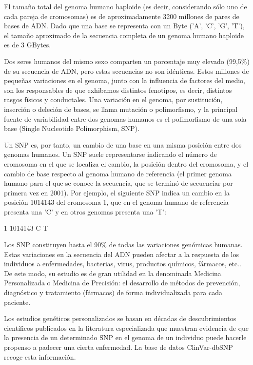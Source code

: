 El tamaño total del genoma humano haploide (es decir, considerando sólo uno de cada pareja de cromosomas) es de aproximadamente 3200 millones de pares de bases de A\-D\-N. Dado que una base se representa con un Byte ('A', 'C', 'G', 'T'), el tamaño aproximado de la secuencia completa de un genoma humano haploide es de 3 G\-Bytes.

Dos seres humanos del mismo sexo comparten un porcentaje muy elevado (99,5\%) de su secuencia de A\-D\-N, pero estas secuencias no son idénticas. Estos millones de pequeñas variaciones en el genoma, junto con la influencia de factores del medio, son los responsables de que exhibamos distintos fenotipos, es decir, distintos rasgos físicos y conductales. Una variación en el genoma, por sustitución, inserción o deleción de bases, se llama mutación o polimorfismo, y la principal fuente de variabilidad entre dos genomas humanos es el polimorfismo de una sola base (Single Nucleotide Polimorphism, S\-N\-P).

Un S\-N\-P es, por tanto, un cambio de una base en una misma posición entre dos genomas humanos. Un S\-N\-P suele representarse indicando el número de cromosoma en el que se localiza el cambio, la posición dentro del cromosoma, y el cambio de base respecto al genoma humano de referencia (el primer genoma humano para el que se conoce la secuencia, que se terminó de secuenciar por primera vez en 2001). Por ejemplo, el siguiente S\-N\-P indica un cambio en la posición 1014143 del cromosoma 1, que en el genoma humano de referencia presenta una 'C' y en otros genomas presenta una 'T'\-:


\begin{DoxyCode}
1 1014143 C T
\end{DoxyCode}


Los S\-N\-P constituyen hasta el 90\% de todas las variaciones genómicas humanas. Estas variaciones en la secuencia del A\-D\-N pueden afectar a la respuesta de los individuos a enfermedades, bacterias, virus, productos químicos, fármacos, etc.. De este modo, su estudio es de gran utilidad en la denominada Medicina Personalizada o Medicina de Precisión\-: el desarrollo de métodos de prevención, diagnóstico y tratamiento (fármacos) de forma individualizada para cada paciente.

Los estudios genéticos personalizados se basan en décadas de descubrimientos científicos publicados en la literatura especializada que muestran evidencia de que la presencia de un determinado S\-N\-P en el genoma de un individuo puede hacerle propenso a padecer una cierta enfermedad. La base de datos Clin\-Var-\/db\-S\-N\-P recoge esta información.

